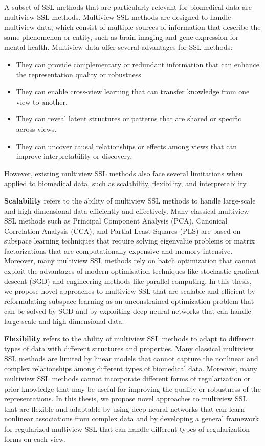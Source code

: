 A subset of SSL methods that are particularly relevant for biomedical data are multiview SSL methods. Multiview SSL methods are designed to handle multiview data, which consist of multiple sources of information that describe the same phenomenon or entity, such as brain imaging and gene expression for mental health. Multiview data offer several advantages for SSL methods: 

\begin{itemize} \item They can provide complementary or redundant information that can enhance the representation quality or robustness. \item They can enable cross-view learning that can transfer knowledge from one view to another. \item They can reveal latent structures or patterns that are shared or specific across views. \item They can uncover causal relationships or effects among views that can improve interpretability or discovery. \end{itemize}

However, existing multiview SSL methods also face several limitations when applied to biomedical data, such as scalability, flexibility, and interpretability.

\textbf{Scalability} refers to the ability of multiview SSL methods to handle large-scale and high-dimensional data efficiently and effectively. Many classical multiview SSL methods such as Principal Component Analysis (PCA), Canonical Correlation Analysis (CCA), and Partial Least Squares (PLS) are based on subspace learning techniques that require solving eigenvalue problems or matrix factorizations that are computationally expensive and memory-intensive. Moreover, many multiview SSL methods rely on batch optimization that cannot exploit the advantages of modern optimisation techniques like stochastic gradient descent (SGD) and engineering methods like parallel computing. In this thesis, we propose novel approaches to multiview SSL that are scalable and efficient by reformulating subspace learning as an unconstrained optimization problem that can be solved by SGD and by exploiting deep neural networks that can handle large-scale and high-dimensional data.

\textbf{Flexibility} refers to the ability of multiview SSL methods to adapt to different types of data with different structures and properties. Many classical multiview SSL methods are limited by linear models that cannot capture the nonlinear and complex relationships among different types of biomedical data. Moreover, many multiview SSL methods cannot incorporate different forms of regularization or prior knowledge that may be useful for improving the quality or robustness of the representations. In this thesis, we propose novel approaches to multiview SSL that are flexible and adaptable by using deep neural networks that can learn nonlinear associations from complex data and by developing a general framework for regularized multiview SSL that can handle different types of regularization forms on each view.

